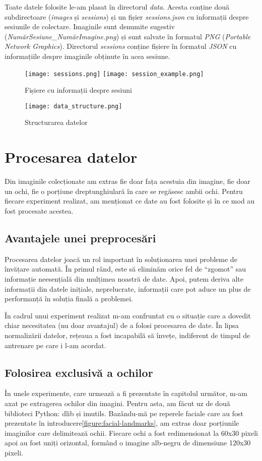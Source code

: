 Toate datele folosite le-am plasat în directorul \emph{data}.
Acesta conține două subdirectoare (\emph{images} și \emph{sessions}) și un fișier \emph{sessions.json} cu informații despre sesiunile de colectare.
Imaginile sunt denumite sugestiv (\emph{NumărSesiune\_NumărImagine.png}) și sunt salvate în formatul \emph{PNG} (\emph{Portable Network Graphics}).
Directorul \emph{sessions} conține fișiere în formatul \emph{JSON} cu informațiile despre imaginile obținute în acea sesiune.

\begin{figure}[H]
    \centering
    \texttt{[image: sessions.png]}
    \texttt{[image: session\_example.png]}
    \caption{Fișiere cu informații despre sesiuni}
\end{figure}

\begin{figure}[h]
    \centering
    \texttt{[image: data\_structure.png]}
    \caption{Structurarea datelor}
\end{figure}

\section{Procesarea datelor}
Din imaginile colecționate am extras fie doar fața acestuia din imagine, fie doar un ochi, fie o porțiune dreptunghiulară în care se regăsesc ambii ochi.
Pentru fiecare experiment realizat, am menționat ce date au fost folosite și în ce mod au fost procesate acestea.

\subsection{Avantajele unei preprocesări}
Procesarea datelor joacă un rol important în soluționarea unei probleme de învățare automată.
În primul rând, este  să eliminăm orice fel de ``zgomot'' sau informație neesențială din mulțimea noastră de date.
Apoi, putem deriva alte informații din datele inițiale, neprelucrate, informații care pot aduce un plus de performanță în soluția finală a problemei.

În cadrul unui experiment realizat m-am confruntat cu o situație care a dovedit chiar necesitatea (nu doar avantajul) de a folosi procesarea de date.
În lipsa normalizării datelor, rețeaua a fost incapabilă să învețe, indiferent de timpul de antrenare pe care i l-am acordat.

\subsection{Folosirea exclusivă a ochilor}
\label{data-processing:eyes}
În unele experimente, care urmează a fi prezentate în capitolul următor, m-am axat pe extragerea ochilor din imagini.
Pentru asta, am făcut uz de două biblioteci Python: dlib și imutils.
Bazându-mă pe reperele faciale care au fost prezentate în introducere\ref{figure:facial-landmarks}, am extras doar porțiunile imaginilor care delimitează ochii.
Fiecare ochi a fost redimensionat la 60x30 pixeli apoi au fost uniți orizontal, formând o imagine alb-negru de dimensiune 120x30 pixeli.

